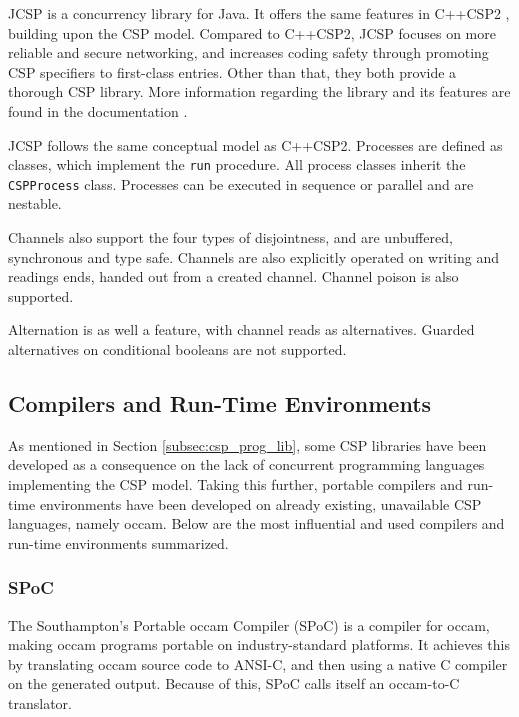 JCSP \citep{jcsp} is a concurrency library for Java. It offers the same features in C++CSP2 \citep{c++csp2}, building upon the CSP model. Compared to C++CSP2, JCSP focuses on more reliable and secure networking, and increases coding safety through promoting CSP specifiers to first-class entries. Other than that, they both provide a thorough CSP library. More information regarding the library and its features are found in the documentation \citep{jcspdoc}. 

JCSP follows the same conceptual model as C++CSP2. Processes are defined as classes, which implement the \texttt{run} procedure. All process classes inherit the \texttt{CSPProcess} class. Processes can be executed in sequence or parallel and are nestable. 

Channels also support the four types of disjointness, and are unbuffered, synchronous and type safe. Channels are also explicitly operated on writing and readings ends, handed out from a created channel. Channel poison is also supported.

Alternation is as well a feature, with channel reads as alternatives. Guarded alternatives on conditional booleans are not supported. 


\subsection{Compilers and Run-Time Environments}
\label{subsec:csp_comp_runtime}

As mentioned in Section \ref{subsec:csp_prog_lib}, some CSP libraries have been developed as a consequence on the lack of concurrent programming languages implementing the CSP model. Taking this further, portable compilers and run-time environments have been developed on already existing, unavailable CSP languages, namely occam. Below are the most influential and used compilers and run-time environments summarized. 


\subsubsection{SPoC}
\label{sssec:spoc}

The Southampton's Portable occam Compiler (SPoC) \citep{spoc} is a compiler for occam, making occam programs portable on industry-standard platforms. It achieves this by translating occam source code to ANSI-C, and then using a native C compiler on the generated output. Because of this, SPoC calls itself an occam-to-C translator. 

